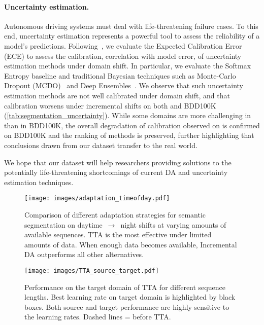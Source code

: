 \paragraph{Uncertainty estimation.} Autonomous driving systems must deal with life-threatening failure cases. To this end, uncertainty estimation represents a powerful tool to assess the reliability of a model's predictions. 
Following~\cite{guo2017calibration}, we evaluate the Expected Calibration Error (ECE) to assess the calibration, \ie{} correlation with model error, of uncertainty estimation methods under domain shift.
In particular, we evaluate the Softmax Entropy baseline and traditional Bayesian techniques such as Monte-Carlo Dropout (MCDO)~\cite{gal2016dropout} and Deep Ensembles~\cite{lakshminarayanan2017simple}.
We observe that such uncertainty estimation methods are not well calibrated under domain shift, and that calibration worsens under incremental shifts on both \thedataset and BDD100K (\autoref{tab:segmentation_uncertainty}).
While some domains are more challenging in \thedataset than in BDD100K, the overall degradation of calibration observed on \thedataset is confirmed on BDD100K and the ranking of methods is preserved, further highlighting that conclusions drawn from our dataset transfer to the real world.

We hope that our dataset will help researchers providing solutions to the potentially life-threatening shortcomings of current DA and uncertainty estimation techniques.

\begin{figure}[t]
    \centering
    \texttt{[image: images/adaptation\_timeofday.pdf]}
  \caption{Comparison of different adaptation strategies for semantic segmentation on daytime~$\xrightarrow{}$~night shifts at varying amounts of available sequences. TTA is the most effective under limited amounts of data. When enough data becomes available, Incremental DA outperforms all other alternatives.}
    \label{fig:compare_adaptation_strategies}
\end{figure}

\begin{figure}[t]
    \centering
    \texttt{[image: images/TTA\_source\_target.pdf]}
    \caption{Performance on the target domain of TTA for different sequence lengths. Best learning rate on target domain is highlighted by black boxes. Both source and target performance are highly sensitive to the learning rates. Dashed lines = before TTA.}
    \label{fig:tta_histograms}
    \vspace{-1em}
\end{figure}

